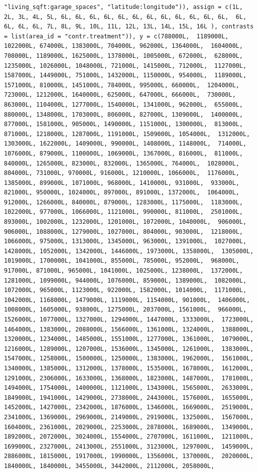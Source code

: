 \documentclass[
]{article}
\begin{document}
\begin{verbatim}
"living_sqft:garage_spaces", "latitude:longitude")), assign = c(1L,  2L, 3L, 4L, 5L, 6L, 6L, 6L, 6L, 6L, 6L, 6L, 6L, 6L, 6L, 6L, 6L,  6L, 6L, 6L, 6L, 7L, 8L, 9L, 10L, 11L, 12L, 13L, 14L, 15L, 16L ), contrasts = list(area_id = "contr.treatment")), y = c(788000L,  1189000L, 1022000L, 674000L, 1383000L, 704000L, 962000L, 1364000L,  1604000L, 708000L, 1189000L, 1625000L, 1378000L, 1005000L, 672000L,  628000L, 1235000L, 1026000L, 1048000L, 721000L, 1415000L, 712000L,  1127000L, 1587000L, 1449000L, 751000L, 1432000L, 1150000L, 954000L,  1189000L, 1571000L, 810000L, 1451000L, 784000L, 995000L, 660000L,  1204000L, 723000L, 1212000L, 1640000L, 625000L, 647000L, 666000L,  730000L, 863000L, 1104000L, 1277000L, 1540000L, 1341000L, 962000L,  655000L, 880000L, 1348000L, 1703000L, 806000L, 827000L, 1309000L,  1400000L, 877000L, 1581000L, 905000L, 1490000L, 1151000L, 1300000L,  813000L, 871000L, 1218000L, 1287000L, 1191000L, 1509000L, 1054000L,  1312000L, 1303000L, 1622000L, 1409000L, 990000L, 1408000L, 1148000L,  714000L, 1076000L, 879000L, 1100000L, 1069000L, 1367000L, 816000L,  811000L, 840000L, 1265000L, 823000L, 832000L, 1365000L, 764000L,  1028000L, 804000L, 731000L, 970000L, 916000L, 1210000L, 1066000L,  1176000L, 1385000L, 899000L, 1071000L, 968000L, 1410000L, 931000L,  933000L, 821000L, 950000L, 1024000L, 897000L, 891000L, 1372000L,  1064000L, 912000L, 1266000L, 840000L, 879000L, 1283000L, 1175000L,  1183000L, 1022000L, 977000L, 1066000L, 1121000L, 990000L, 811000L,  2501000L, 893000L, 1002000L, 1232000L, 1201000L, 1072000L, 1040000L,  906000L, 906000L, 1088000L, 1279000L, 1027000L, 804000L, 903000L,  1218000L, 1066000L, 975000L, 1313000L, 1345000L, 963000L, 1391000L,  1027000L, 1428000L, 1052000L, 1342000L, 1446000L, 1973000L, 1358000L,  1305000L, 1019000L, 1700000L, 1041000L, 855000L, 785000L, 952000L,  968000L, 917000L, 871000L, 965000L, 1041000L, 1025000L, 1238000L,  1372000L, 1281000L, 1099000L, 944000L, 1076000L, 859000L, 1389000L,  1082000L, 1072000L, 965000L, 1123000L, 922000L, 1582000L, 1014000L,  1171000L, 1042000L, 1168000L, 1479000L, 1119000L, 1154000L, 901000L,  1406000L, 1008000L, 1605000L, 938000L, 1275000L, 2037000L, 1561000L,  966000L, 1526000L, 1077000L, 1327000L, 1294000L, 1447000L, 1333000L,  1723000L, 1464000L, 1383000L, 2088000L, 1566000L, 1361000L, 1324000L,  1388000L, 1320000L, 1234000L, 1485000L, 1551000L, 1277000L, 1361000L,  1079000L, 1216000L, 1289000L, 1207000L, 1536000L, 1345000L, 1261000L,  1383000L, 1547000L, 1258000L, 1500000L, 1250000L, 1383000L, 1962000L,  1561000L, 1340000L, 1385000L, 1312000L, 1378000L, 1535000L, 1678000L,  1612000L, 1291000L, 2306000L, 1633000L, 1368000L, 1823000L, 1487000L,  1781000L, 1494000L, 1754000L, 1400000L, 1121000L, 1343000L, 1565000L,  2633000L, 1849000L, 1941000L, 1429000L, 2738000L, 2443000L, 1576000L,  1655000L, 1452000L, 1427000L, 2342000L, 1876000L, 1346000L, 1669000L,  2519000L, 2341000L, 1369000L, 2969000L, 2149000L, 2919000L, 1325000L,  1567000L, 1604000L, 2361000L, 2029000L, 2253000L, 2878000L, 1689000L,  1349000L, 1892000L, 2072000L, 3024000L, 1554000L, 2707000L, 1611000L,  1211000L, 1699000L, 2327000L, 2413000L, 2551000L, 3123000L, 1297000L,  1459000L, 2886000L, 1815000L, 1917000L, 1990000L, 1356000L, 1370000L,  2020000L, 1840000L, 1840000L, 3455000L, 3442000L, 2112000L, 2058000L,  
\end{verbatim}
\end{document}
